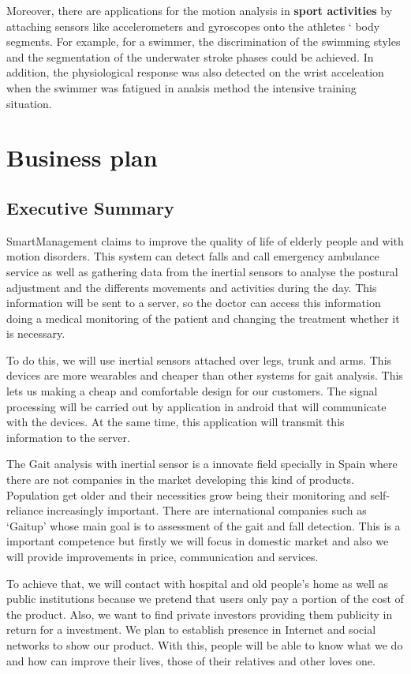 Moreover, there are applications for the motion analysis in \textbf{sport activities} by attaching sensors like accelerometers and gyroscopes onto the athletes ‘  body segments. For example, for a swimmer, the discrimination of the swimming styles and the segmentation of the underwater stroke phases could be achieved. In addition, the physiological response was also detected on the wrist acceleation when the swimmer was fatigued in analsis method the intensive training situation\cite{Yuji}.



\section{Business plan }
\subsection{Executive Summary}
SmartManagement claims to improve  the quality of life of elderly  people and with motion disorders. This system can detect falls and call emergency ambulance service as well as gathering data from the inertial sensors to analyse the postural adjustment and the differents movements and activities during the day. This information will be sent to a server, so the doctor can access this information  doing a medical monitoring of the patient and changing the treatment whether it is necessary.

To do this, we will use inertial sensors attached over legs, trunk and arms. This devices are more wearables and cheaper than other systems for gait analysis. This lets us making a cheap and comfortable design for our customers. The signal processing will be carried out by application in android that will communicate with the devices. At the same time, this application will transmit this information to the server.

The Gait analysis with inertial sensor is a innovate field specially in Spain where there are not companies in the market developing this kind of products. Population get older and their necessities grow being their monitoring and self-reliance increasingly important.
There are international companies such as ‘Gaitup’ whose main goal is to assessment of the gait  and fall detection. This is a important competence but firstly we will focus in domestic market and also we will provide improvements in price, communication and services.

To achieve that, we will contact with hospital and old people’s home as well as public institutions because we pretend that users only pay a portion of the cost of the product. Also, we want to find private investors providing them publicity in return for a investment.
We plan to establish presence in Internet and social networks to show our product. With this, people will be able to know what we do and how can improve their lives, those of their relatives and other loves one.

